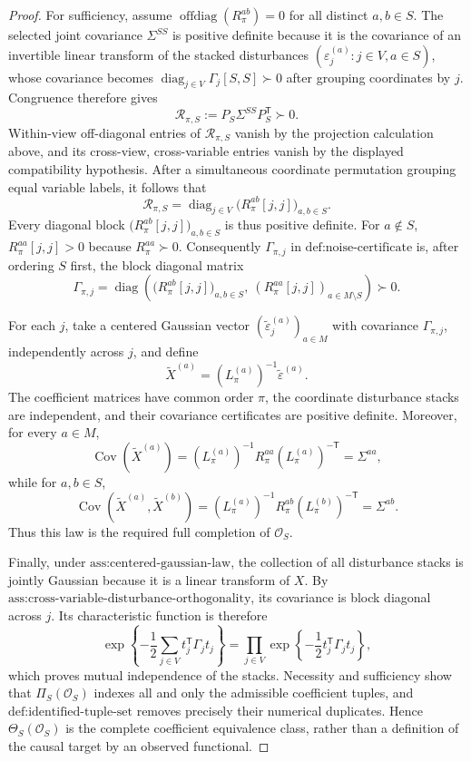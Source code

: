 \documentclass{article}
\begin{document}
\begin{proof}
For sufficiency, assume \(\operatorname{offdiag}(R_\pi^{ab})=0\) for all distinct \(a,b\in S\).  The selected joint covariance \(\Sigma^{SS}\) is positive definite because it is the covariance of an invertible linear transform of the stacked disturbances \((\varepsilon_j^{(a)}:j\in V,a\in S)\), whose covariance becomes \(\operatorname{diag}_{j\in V}\Gamma_j[S,S]\succ0\) after grouping coordinates by \(j\).  Congruence therefore gives
\[
\mathscr R_{\pi,S}:=P_S\Sigma^{SS}P_S^{\mathsf T}\succ0.
\]
Within-view off-diagonal entries of \(\mathscr R_{\pi,S}\) vanish by the projection calculation above, and its cross-view, cross-variable entries vanish by the displayed compatibility hypothesis.  After a simultaneous coordinate permutation grouping equal variable labels, it follows that
\[
\mathscr R_{\pi,S}=\operatorname{diag}_{j\in V}\bigl(R_\pi^{ab}[j,j]\bigr)_{a,b\in S}.
\]
Every diagonal block \(\bigl(R_\pi^{ab}[j,j]\bigr)_{a,b\in S}\) is thus positive definite.  For \(a\notin S\), \(R_\pi^{aa}[j,j]>0\) because \(R_\pi^{aa}\succ0\).  Consequently \(\Gamma_{\pi,j}\) in \(\text{def:noise-certificate}\) is, after ordering \(S\) first, the block diagonal matrix
\[
\Gamma_{\pi,j}=\operatorname{diag}\!\left(\bigl(R_\pi^{ab}[j,j]\bigr)_{a,b\in S},\ (R_\pi^{aa}[j,j])_{a\in M\setminus S}\right)\succ0.
\]

For each \(j\), take a centered Gaussian vector \((\widetilde\varepsilon_j^{(a)})_{a\in M}\) with covariance \(\Gamma_{\pi,j}\), independently across \(j\), and define
\[
\widetilde X^{(a)}=(L_\pi^{(a)})^{-1}\widetilde\varepsilon^{(a)}.
\]
The coefficient matrices have common order \(\pi\), the coordinate disturbance stacks are independent, and their covariance certificates are positive definite.  Moreover, for every \(a\in M\),
\[
\operatorname{Cov}(\widetilde X^{(a)})
=(L_\pi^{(a)})^{-1}R_\pi^{aa}(L_\pi^{(a)})^{-\mathsf T}=\Sigma^{aa},
\]
while for \(a,b\in S\),
\[
\operatorname{Cov}(\widetilde X^{(a)},\widetilde X^{(b)})
=(L_\pi^{(a)})^{-1}R_\pi^{ab}(L_\pi^{(b)})^{-\mathsf T}=\Sigma^{ab}.
\]
Thus this law is the required full completion of \(\mathcal O_S\).

Finally, under \(\text{ass:centered-gaussian-law}\), the collection of all disturbance stacks is jointly Gaussian because it is a linear transform of \(X\).  By \(\text{ass:cross-variable-disturbance-orthogonality}\), its covariance is block diagonal across \(j\).  Its characteristic function is therefore
\[
\exp\!\left\{-\frac12\sum_{j\in V}t_j^{\mathsf T}\Gamma_jt_j\right\}
=\prod_{j\in V}\exp\!\left\{-\frac12t_j^{\mathsf T}\Gamma_jt_j\right\},
\]
which proves mutual independence of the stacks.  Necessity and sufficiency show that \(\Pi_S(\mathcal O_S)\) indexes all and only the admissible coefficient tuples, and \(\text{def:identified-tuple-set}\) removes precisely their numerical duplicates.  Hence \(\Theta_S(\mathcal O_S)\) is the complete coefficient equivalence class, rather than a definition of the causal target by an observed functional.
\end{proof}
\end{document}
